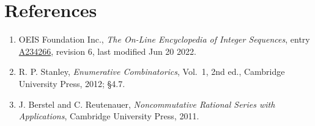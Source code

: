 \documentclass[11pt]{article}
\theoremstyle{definition}
\begin{document}
\section{References}

\begin{enumerate}

\item OEIS Foundation Inc., \emph{The On-Line Encyclopedia of Integer Sequences}, entry \href{https://oeis.org/A234266}{A234266}, revision 6, last modified Jun 20 2022.

\item R. P. Stanley, \emph{Enumerative Combinatorics}, Vol.~1, 2nd ed., Cambridge University Press, 2012; \S4.7.

\item J. Berstel and C. Reutenauer, \emph{Noncommutative Rational Series with Applications}, Cambridge University Press, 2011.

\end{enumerate}
\end{document}
